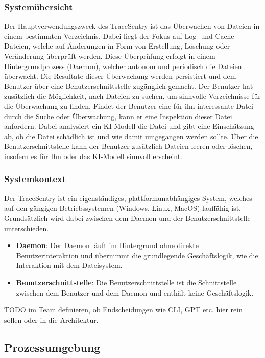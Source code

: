 \documentclass[a4paper,12pt]{report}
\begin{document}
    \subsubsection{Systemübersicht}
    Der Hauptverwendungszweck des TraceSentry ist das Überwachen von Dateien in einem bestimmten Verzeichnis.
    Dabei liegt der Fokus auf Log- und Cache-Dateien, welche auf Änderungen in Form von Erstellung, Löschung oder Veränderung überprüft werden.
    Diese Überprüfung erfolgt in einem Hintergrundprozess (Daemon), welcher autonom und periodisch die Dateien überwacht.
    Die Resultate dieser Überwachung werden persistiert und dem Benutzer über eine Benutzerschnittstelle zugänglich gemacht.
    Der Benutzer hat zusätzlich die Möglichkeit, nach Dateien zu suchen, um sinnvolle Verzeichnisse für die Überwachung zu finden.
    Findet der Benutzer eine für ihn interessante Datei durch die Suche oder Überwachung, kann er eine Inspektion dieser Datei anfordern.
    Dabei analysiert ein KI-Modell die Datei und gibt eine Einschätzung ab, ob die Datei schädlich ist und wie damit umgegangen werden sollte.
    Über die Benutzerschnittstelle kann der Benutzer zusätzlich Dateien leeren oder löschen, insofern es für Ihn oder das KI-Modell sinnvoll erscheint.

    \subsubsection{Systemkontext}
    Der TraceSentry ist ein eigenständiges, plattformunabhängiges System, welches auf den gängigen Betriebssystemen (Windows, Linux, MacOS) lauffähig ist.
    Grundsätzlich wird dabei zwischen dem Daemon und der Benutzerschnittstelle unterschieden.
    \begin{itemize}
        \item \textbf{Daemon}: Der Daemon läuft im Hintergrund ohne direkte Benutzerinteraktion und übernimmt die grundlegende Geschäftslogik, wie die Interaktion mit dem Dateisystem.
        \item \textbf{Benutzerschnittstelle}: Die Benutzerschnittstelle ist die Schnittstelle zwischen dem Benutzer und dem Daemon und enthält keine Geschäftslogik.
    \end{itemize}

    TODO im Team definieren, ob Endscheidungen wie CLI, GPT etc. hier rein sollen oder in die Architektur.


    \clearpage

    \subsection{Prozessumgebung}
\end{document}
